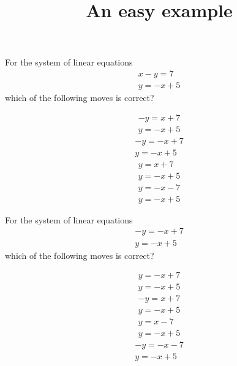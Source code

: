 \documentclass{webquiz}
\title{An easy example}
\begin{document}
\begin{question} %
For the system of linear equations
\begin{gather*} 
x-y=7\\
y=-x+5
\end{gather*}
which of the following moves is correct?
\begin{choice}[columns=2] %
\incorrect
\begin{gather*} 
-y=x+7\\
y=-x+5
\end{gather*}
\correct
\begin{gather*} 
-y=-x+7\\
y=-x+5
\end{gather*}
\incorrect
\begin{gather*} 
y=x+7\\
y=-x+5
\end{gather*}
\incorrect
\begin{gather*} 
y=-x-7\\
y=-x+5
\end{gather*}
\end{choice}
\end{question}



\begin{question} %
For the system of linear equations
\begin{gather*} 
-y=-x+7\\
y=-x+5
\end{gather*}
which of the following moves is correct?
\begin{choice}[columns=2] %
\incorrect
\begin{gather*} 
y=-x+7\\
y=-x+5
\end{gather*}
\incorrect
\begin{gather*} 
-y=x+7\\
y=-x+5
\end{gather*}
\correct
\begin{gather*} 
y=x-7\\
y=-x+5
\end{gather*}
\incorrect
\begin{gather*} 
-y=-x-7\\
y=-x+5
\end{gather*}
\end{choice}
\end{question}
\end{document}
